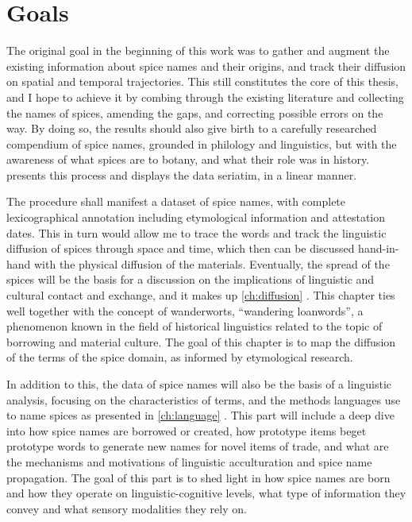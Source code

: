 \section{Goals}

The original goal in the beginning of this work was to gather and augment the existing information about spice names and their origins, and track their diffusion on spatial and temporal trajectories. This still constitutes the core of this thesis, and I hope to achieve it by combing through the existing literature and collecting the names of spices, amending the gaps, and correcting possible errors on the way. By doing so, the results should also give birth to a carefully researched compendium of spice names, grounded in philology and linguistics, but with the awareness of what spices are to botany, and what their role was in history.   presents this process and displays the data seriatim, in a linear manner. 

The procedure shall manifest a dataset of spice names, with complete lexicographical annotation including etymological information and attestation dates. This in turn would allow me to trace the words and track the linguistic diffusion of spices through space and time, which then can be discussed hand-in-hand with the physical diffusion of the materials. Eventually, the spread of the spices will be the basis for a discussion on the implications of linguistic and cultural contact and exchange, and it makes up \cref{ch:diffusion} . This chapter ties well together with the concept of \glspl{wanderwort}, ``wandering loanwords'', a phenomenon known in the field of historical linguistics related to the topic of borrowing and material culture. The goal of this chapter is to map the diffusion of the terms of the spice domain, as informed by etymological research.

In addition to this, the data of spice names will also be the basis of a linguistic analysis, focusing on the characteristics of terms, and the methods languages use to name spices as presented in \cref{ch:language} . This part will include a deep dive into how spice names are borrowed or created, how prototype items beget prototype words to generate new names for novel items of trade, and what are the mechanisms and motivations of linguistic acculturation and spice name propagation. The goal of this part is to shed light in how spice names are born and how they operate on linguistic-cognitive levels, what type of information they convey and what sensory modalities they rely on.

